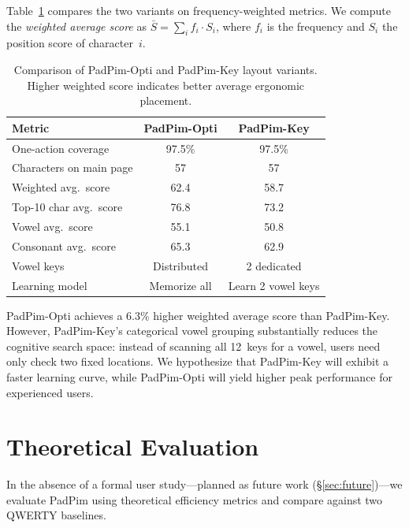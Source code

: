 \documentclass[10pt,twocolumn,a4paper]{article}
\begin{document}
Table~\ref{tab:variant_compare} compares the two variants on frequency-weighted metrics.
We compute the \emph{weighted average score} as $\bar{S} = \sum_{i} f_i \cdot S_i$, where $f_i$ is the frequency and $S_i$ the position score of character~$i$.

\begin{table}[t]
\centering
\caption{Comparison of PadPim-Opti and PadPim-Key layout variants. Higher weighted score indicates better average ergonomic placement.}
\label{tab:variant_compare}
\small
\begin{tabular}{@{}lcc@{}}
\toprule
\textbf{Metric} & \textbf{PadPim-Opti} & \textbf{PadPim-Key} \\
\midrule
One-action coverage    & 97.5\%  & 97.5\% \\
Characters on main page & 57    & 57 \\
Weighted avg.\ score  & 62.4    & 58.7 \\
Top-10 char avg.\ score & 76.8  & 73.2 \\
Vowel avg.\ score     & 55.1    & 50.8 \\
Consonant avg.\ score & 65.3    & 62.9 \\
Vowel keys            & Distributed & 2 dedicated \\
Learning model        & Memorize all & Learn 2 vowel keys \\
\bottomrule
\end{tabular}
\end{table}

PadPim-Opti achieves a 6.3\% higher weighted average score than PadPim-Key.
However, PadPim-Key's categorical vowel grouping substantially reduces the cognitive search space: instead of scanning all 12~keys for a vowel, users need only check two fixed locations.
We hypothesize that PadPim-Key will exhibit a faster learning curve, while PadPim-Opti will yield higher peak performance for experienced users.

\section{Theoretical Evaluation}
\label{sec:eval}

In the absence of a formal user study---planned as future work (\S\ref{sec:future})---we evaluate PadPim using theoretical efficiency metrics and compare against two QWERTY baselines.
\end{document}
